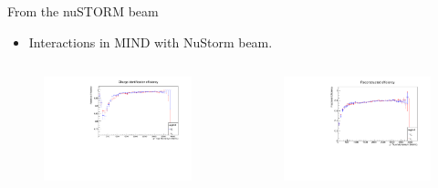\documentclass[11pt]{beamer}
\begin{document}
\begin{frame}{From the nuSTORM beam}
\begin{block}{}
	\begin{tiny}
		\begin{itemize}
			\item Interactions in MIND with NuStorm beam.
		\end{itemize}
	\end{tiny}
\end{block}
\begin{columns}[T] %
	\begin{column}{.48\textwidth}
		
		\begin{figure}[h!]
			\centering
			\includegraphics[width=\textwidth]{NuStorm/ChargeIDNeutrinoBeamMIND.pdf}
		\end{figure}
	\end{column}%
	\begin{column}{.48\textwidth}
		\begin{figure}[h!]
			\centering
			\includegraphics[width=\textwidth]{NuStorm/FittedNeutrinoBeamMIND.pdf}
		\end{figure}
	\end{column}%
\end{columns}
\end{frame}
\end{document}
